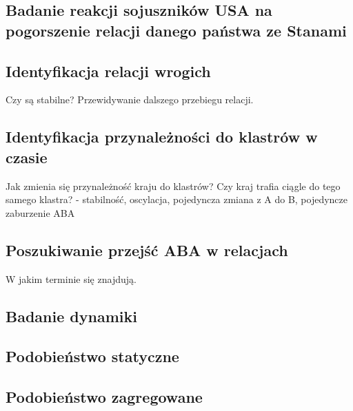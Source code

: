 \documentclass[11pt]{report}
\begin{document}
    \subsection{Badanie reakcji sojuszników USA na pogorszenie relacji danego państwa ze Stanami}

    \subsection{Identyfikacja relacji wrogich}
    Czy są stabilne?
    Przewidywanie dalszego przebiegu relacji.

    \subsection{Identyfikacja przynależności do klastrów w czasie}
    Jak zmienia się przynależność kraju do klastrów?
    Czy kraj trafia ciągle do tego samego klastra?
    - stabilność, oscylacja, pojedyncza zmiana z A do B, pojedyncze zaburzenie ABA

    \subsection{Poszukiwanie przejść ABA w relacjach}
    W jakim terminie się znajdują.

    \subsection{Badanie dynamiki}

    \subsection{Podobieństwo statyczne}

    \subsection{Podobieństwo zagregowane}
\end{document}
